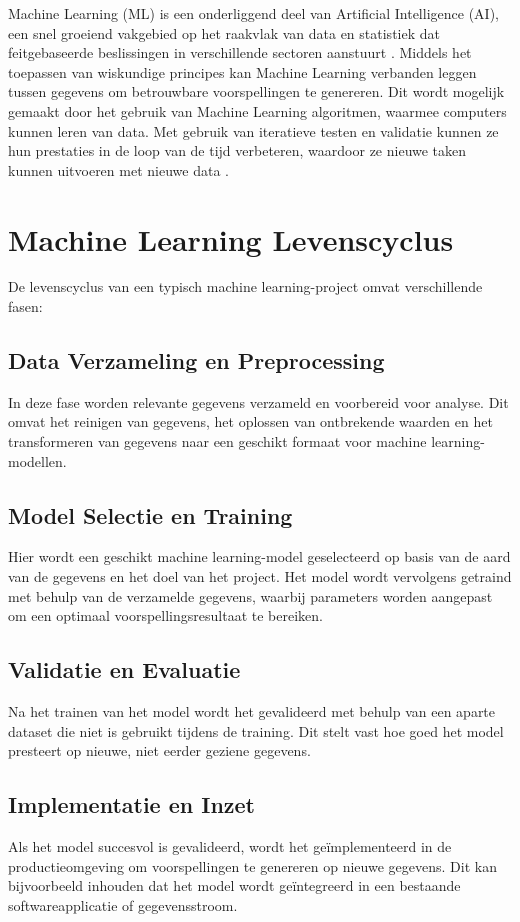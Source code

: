 Machine Learning (ML) is een onderliggend deel van Artificial Intelligence (AI), een snel groeiend vakgebied op het raakvlak van data en statistiek dat feitgebaseerde beslissingen in verschillende sectoren aanstuurt \autocite{Jordan2015}. Middels het toepassen van wiskundige principes kan Machine Learning verbanden leggen tussen gegevens om betrouwbare voorspellingen te genereren. Dit wordt mogelijk gemaakt door het gebruik van Machine Learning algoritmen, waarmee computers kunnen leren van data. Met gebruik van iteratieve testen en validatie kunnen ze hun prestaties in de loop van de tijd verbeteren, waardoor ze nieuwe taken kunnen uitvoeren met nieuwe data \autocite{Shaveta2023}.

\section{Machine Learning Levenscyclus}

De levenscyclus van een typisch machine learning-project omvat verschillende fasen:

\subsection{Data Verzameling en Preprocessing}
In deze fase worden relevante gegevens verzameld en voorbereid voor analyse. Dit omvat het reinigen van gegevens, het oplossen van ontbrekende waarden en het transformeren van gegevens naar een geschikt formaat voor machine learning-modellen.

\subsection{Model Selectie en Training}
Hier wordt een geschikt machine learning-model geselecteerd op basis van de aard van de gegevens en het doel van het project. Het model wordt vervolgens getraind met behulp van de verzamelde gegevens, waarbij parameters worden aangepast om een optimaal voorspellingsresultaat te bereiken.

\subsection{Validatie en Evaluatie}
Na het trainen van het model wordt het gevalideerd met behulp van een aparte dataset die niet is gebruikt tijdens de training. Dit stelt vast hoe goed het model presteert op nieuwe, niet eerder geziene gegevens.

\subsection{Implementatie en Inzet}
Als het model succesvol is gevalideerd, wordt het geïmplementeerd in de productieomgeving om voorspellingen te genereren op nieuwe gegevens. Dit kan bijvoorbeeld inhouden dat het model wordt geïntegreerd in een bestaande softwareapplicatie of gegevensstroom.

